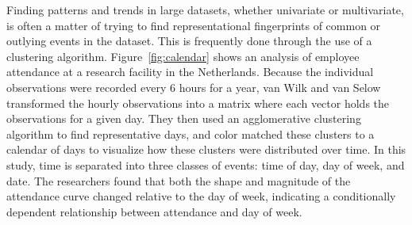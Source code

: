 \documentclass[../main.tex]{subfiles}
\begin{document}
Finding patterns and trends in large datasets, whether univariate or multivariate, is often a matter of trying to find representational fingerprints of common or outlying events in the dataset. This is frequently done through the use of a clustering algorithm. Figure~\ref{fig:calendar} shows an analysis of employee attendance at a research facility in the Netherlands\cite{van_wijk_cluster_1999}. Because the individual observations were recorded every 6 hours for a year, van Wilk and van Selow transformed the hourly observations into a matrix where each vector holds the observations for a given day. They then used an agglomerative clustering algorithm \cite{kaufman_agglomerative_1990} to find representative days, and color matched these clusters to a calendar of days to visualize how these clusters were distributed over time.  In this study, time is separated into three classes of events: time of day, day of week, and date. The researchers found that both the shape and magnitude of the attendance curve changed relative to the day of week, indicating a conditionally dependent relationship between attendance and day of week. 
\end{document}

